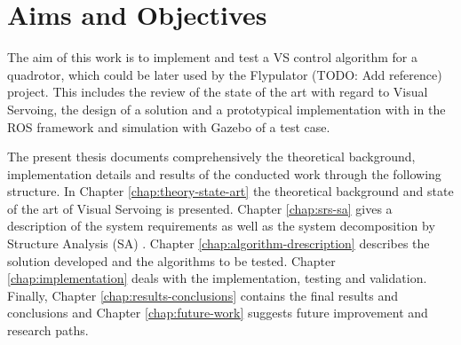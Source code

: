 
\section{Aims and Objectives}
\label{sec:aims-objectives}

The aim of this work is to implement and test a VS control algorithm for a quadrotor, which could be later used by the Flypulator (TODO: Add reference) project. This includes the review of the state of the art with regard to Visual Servoing, the design of a solution and a prototypical implementation with in the ROS framework and simulation with Gazebo of a test case.

The present thesis documents comprehensively the theoretical background, implementation details and results of the conducted work through the following structure. In Chapter \ref{chap:theory-state-art} the theoretical background and state of the art of Visual Servoing is presented. Chapter \ref{chap:srs-sa} gives a description of the system requirements as well as the system decomposition by Structure Analysis (SA) \cite{SA_Braune}. Chapter \ref{chap:algorithm-drescription} describes the solution developed and the algorithms to be tested. Chapter \ref{chap:implementation} deals with the implementation, testing and validation. Finally, Chapter \ref{chap:results-conclusions} contains the final results and conclusions and Chapter \ref{chap:future-work} suggests future improvement and research paths.

